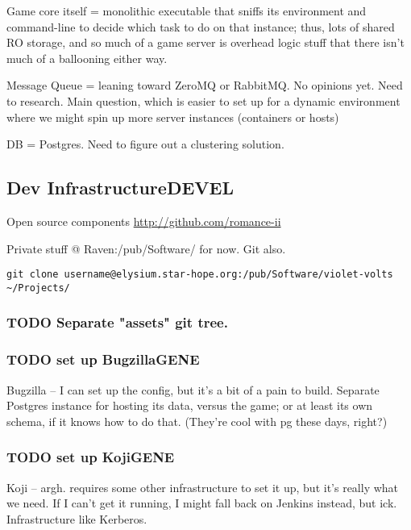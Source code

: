 \documentclass[11pt]{article}
\begin{document}
Game core itself  = monolithic executable that  sniffs its environment
and command-line  to decide which task  to do on that  instance; thus,
lots of shared  RO storage, and so  much of a game  server is overhead
logic stuff that there isn't much of a ballooning either way.


Message  Queue  =  leaning  toward ZeroMQ  or  RabbitMQ.  No  opinions
yet. Need to research. Main question, which  is easier to set up for a
dynamic  environment where  we  might spin  up  more server  instances
(containers or hosts)

DB = Postgres. Need to figure out a clustering solution.
\subsection{Dev Infrastructure\hfill{}\textsc{DEVEL}}
\label{sec-1-9}

Open source components \url{http://github.com/romance-ii}

Private stuff @ Raven:/pub/Software/ for now. Git also.

\begin{verbatim}
git clone username@elysium.star-hope.org:/pub/Software/violet-volts ~/Projects/
\end{verbatim}

\subsubsection{{\bfseries\sffamily TODO} Separate "assets" git tree.}
\label{sec-1-9-1}

\subsubsection{{\bfseries\sffamily TODO} set up Bugzilla\hfill{}\textsc{GENE}}
\label{sec-1-9-2}

Bugzilla --  I can  set up the  config, but  it's a bit  of a  pain to
build. Separate  Postgres instance  for hosting  its data,  versus the
game; or at least its own schema, if it knows how to do that. (They're
cool with pg these days, right?)
\subsubsection{{\bfseries\sffamily TODO} set up Koji\hfill{}\textsc{GENE}}
\label{sec-1-9-3}

Koji --  argh. requires some  other infrastructure  to set it  up, but
it's really what we need. If I can't get it running, I might fall back
on Jenkins instead, but ick. Infrastructure like Kerberos.
\end{document}
